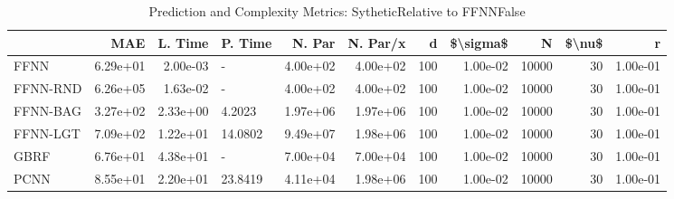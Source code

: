 \begin{table}
\centering
\caption{Prediction and Complexity Metrics: SytheticRelative to FFNNFalse}
\label{tab__Sythetic__Fix_Neurons_QTrue}
\begin{tabular}{lrrlrrrrrrr}
\toprule
{} &      MAE &  L. Time &  P. Time &   N. Par &  N. Par/x &    d &  \$\textbackslash sigma\$ &      N &  \$\textbackslash nu\$ &        r \\
\midrule
FFNN     & 6.29e+01 & 2.00e-03 &        - & 4.00e+02 &  4.00e+02 &  100 &  1.00e-02 &  10000 &     30 & 1.00e-01 \\
FFNN-RND & 6.26e+05 & 1.63e-02 &        - & 4.00e+02 &  4.00e+02 &  100 &  1.00e-02 &  10000 &     30 & 1.00e-01 \\
FFNN-BAG & 3.27e+02 & 2.33e+00 &   4.2023 & 1.97e+06 &  1.97e+06 &  100 &  1.00e-02 &  10000 &     30 & 1.00e-01 \\
FFNN-LGT & 7.09e+02 & 1.22e+01 &  14.0802 & 9.49e+07 &  1.98e+06 &  100 &  1.00e-02 &  10000 &     30 & 1.00e-01 \\
GBRF     & 6.76e+01 & 4.38e+01 &        - & 7.00e+04 &  7.00e+04 &  100 &  1.00e-02 &  10000 &     30 & 1.00e-01 \\
PCNN     & 8.55e+01 & 2.20e+01 &  23.8419 & 4.11e+04 &  1.98e+06 &  100 &  1.00e-02 &  10000 &     30 & 1.00e-01 \\
\bottomrule
\end{tabular}
\end{table}
